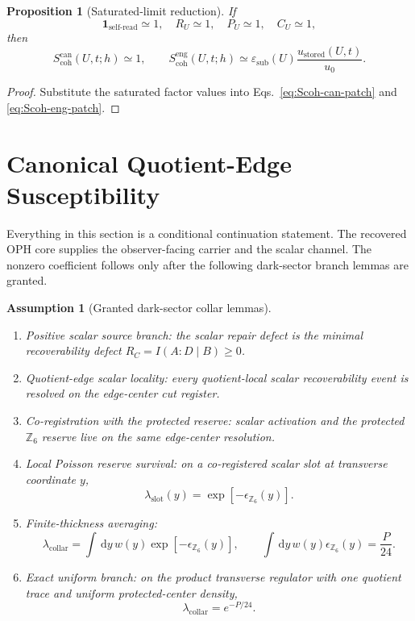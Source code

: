 \documentclass[11pt]{article}
\numberwithin{equation}{section}
\newtheorem{proposition}[theorem]{Proposition}
\newtheorem{assumption}[theorem]{Assumption}
\theoremstyle{remark}
\newcommand{\scohcan}{S_{\mathrm{coh}}^{\mathrm{can}}}
\newcommand{\scoheng}{S_{\mathrm{coh}}^{\mathrm{eng}}}
\newcommand{\dd}{\,\mathrm d}
\newcommand{\eps}{\varepsilon}
\newcommand{\lambdac}{\lambda_{\mathrm{collar}}}
\newcommand{\Zsix}{\mathbb Z_6}
\begin{document}
\begin{proposition}[Saturated-limit reduction]
If
\[
\mathbf 1_{\mathrm{self\mbox{-}read}}\simeq1,\quad
R_U\simeq1,\quad
P_U\simeq1,\quad
C_U\simeq1,
\]
then
\[
\scohcan(U,t;h)\simeq1,
\qquad
\scoheng(U,t;h)\simeq
\eps_{\mathrm{sub}}(U)\frac{u_{\mathrm{stored}}(U,t)}{u_0}.
\]
\end{proposition}

\begin{proof}
Substitute the saturated factor values into Eqs.~\eqref{eq:Scoh-can-patch}
and \eqref{eq:Scoh-eng-patch}.
\end{proof}

\section{Canonical Quotient-Edge Susceptibility}
\label{sec:canonical-quotient-edge}

Everything in this section is a conditional continuation statement. The
recovered OPH core supplies the observer-facing carrier and the scalar channel.
The nonzero coefficient follows only after the following dark-sector branch
lemmas are granted.

\begin{assumption}[Granted dark-sector collar lemmas]
\label{ass:dark-collar-lemmas}
\begin{enumerate}[label=L\arabic*.,leftmargin=*]
\item Positive scalar source branch: the scalar repair defect is the minimal
recoverability defect \(R_C=I(A:D\mid B)\ge0\).
\item Quotient-edge scalar locality: every quotient-local scalar recoverability
event is resolved on the edge-center cut register.
\item Co-registration with the protected reserve: scalar activation and the
protected \(\Zsix\) reserve live on the same edge-center resolution.
\item Local Poisson reserve survival: on a co-registered scalar slot at
transverse coordinate \(y\),
\[
\lambda_{\mathrm{slot}}(y)=\exp[-\epsilon_{\Zsix}(y)].
\]
\item Finite-thickness averaging:
\[
\lambdac=
\int \dd y\,w(y)\exp[-\epsilon_{\Zsix}(y)],
\qquad
\int \dd y\,w(y)\epsilon_{\Zsix}(y)=\frac{P}{24}.
\]
\item Exact uniform branch: on the product transverse regulator with one
quotient trace and uniform protected-center density,
\[
\lambdac=e^{-P/24}.
\]
\end{enumerate}
\end{assumption}
\end{document}
